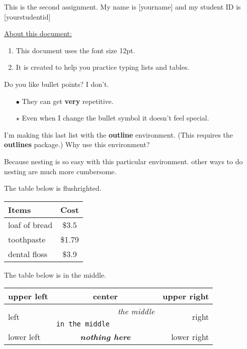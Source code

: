 \documentclass[12pt]{article}
\begin{document}
This is the second assignment. My name is [yourname] and my student ID is [yourstudentid]

\underline{About this document:}

\begin{enumerate}
\item This document uses the font size 12pt.
\item It is created to help you practice typing lists and tables.
\end{enumerate}


Do you like bullet points? I don't.


\begin{enumerate}
\item[$\bullet$] They can get \textbf{very} repetitive.
\item[$\star$] Even when I change the bullet symbol it doesn't feel special.
\end{enumerate}

I'm making this last list with the \textbf{outline} environment. (This requires the \textbf{outlines} package.) Why use this environment?

\begin{outline}
\1 Because nesting
\2 is so easy
\1 with this particular
\2 environment.
\3 other ways to do nesting are much more cumbersome.
\end{outline}

The table below is flushrighted.
\begin{flushright}
\begin{tabular}{|l|c|} \hline
\textbf{Items} & \textbf{Cost}\\ \hline
loaf of bread & \$3.5\\
toothpaste & \$1.79\\
dental floss & \$3.9\\ \hline
\end{tabular}
\end{flushright}

The table below is in the middle.

\begin{center}
\begin{tabular}{|l|c|c|r|} \hline
upper left & \multicolumn{2}{c|}{\textbf{center}} & upper right \\ \hline
\multirow{2}{*}{left} &  & \textit{the middle} & \multirow{2}{*}{right} \\ \cline{2-3} 
& \texttt{in the middle} & &  \\ \hline
lower left & \multicolumn{2}{c|}{\textbf{\textit{nothing here}}} & lower right \\ \hline
\end{tabular}
\end{center}
\end{document}
